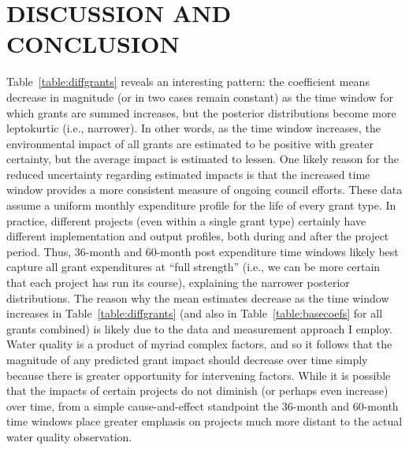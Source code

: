\documentclass[12pt,a4paper,titlepage]{article}
\begin{document}
\section*{\bf\MakeUppercase{Discussion and Conclusion}}

Table~\ref{table:diffgrants} reveals an interesting pattern: the coefficient means decrease in magnitude (or in two cases remain constant) as the time window for which grants are summed increases, but the posterior distributions become more leptokurtic (i.e., narrower). In other words, as the time window increases, the environmental impact of all grants are estimated to be positive with greater certainty, but the average impact is estimated to lessen. One likely reason for the reduced uncertainty regarding estimated impacts is that the increased time window provides a more consistent measure of ongoing council efforts. These data assume a uniform monthly expenditure profile for the life of every grant type. In practice, different projects (even within a single grant type) certainly have different implementation and output profiles, both during and after the project period. Thus, 36-month and 60-month post expenditure time windows likely best capture all grant expenditures at ``full strength'' (i.e., we can be more certain that each project has run its course), explaining the narrower posterior distributions. The reason why the mean estimates decrease as the time window increases in Table~\ref{table:diffgrants} (and also in Table~\ref{table:basecoefs} for all grants combined) is likely due to the data and measurement approach I employ. Water quality is a product of myriad complex factors, and so it follows that the magnitude of any predicted grant impact should decrease over time simply because there is greater opportunity for intervening factors. While it is possible that the impacts of certain projects do not diminish (or perhaps even increase) over time, from a simple cause-and-effect standpoint the 36-month and 60-month time windows place greater emphasis on projects much more distant to the actual water quality observation.
\end{document}
